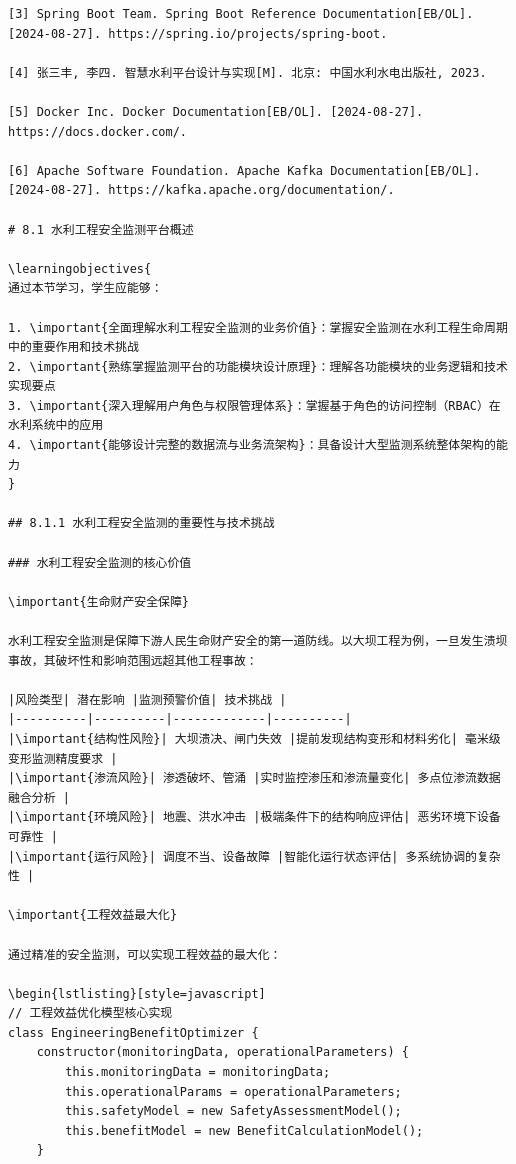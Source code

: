 \begin{verbatim}
[3] Spring Boot Team. Spring Boot Reference Documentation[EB/OL]. [2024-08-27]. https://spring.io/projects/spring-boot.

[4] 张三丰, 李四. 智慧水利平台设计与实现[M]. 北京: 中国水利水电出版社, 2023.

[5] Docker Inc. Docker Documentation[EB/OL]. [2024-08-27]. https://docs.docker.com/.

[6] Apache Software Foundation. Apache Kafka Documentation[EB/OL]. [2024-08-27]. https://kafka.apache.org/documentation/.

# 8.1 水利工程安全监测平台概述

\learningobjectives{
通过本节学习，学生应能够：

1. \important{全面理解水利工程安全监测的业务价值}：掌握安全监测在水利工程生命周期中的重要作用和技术挑战
2. \important{熟练掌握监测平台的功能模块设计原理}：理解各功能模块的业务逻辑和技术实现要点
3. \important{深入理解用户角色与权限管理体系}：掌握基于角色的访问控制（RBAC）在水利系统中的应用
4. \important{能够设计完整的数据流与业务流架构}：具备设计大型监测系统整体架构的能力
}

## 8.1.1 水利工程安全监测的重要性与技术挑战

### 水利工程安全监测的核心价值

\important{生命财产安全保障}

水利工程安全监测是保障下游人民生命财产安全的第一道防线。以大坝工程为例，一旦发生溃坝事故，其破坏性和影响范围远超其他工程事故：

|风险类型| 潜在影响 |监测预警价值| 技术挑战 |
|----------|----------|-------------|----------|
|\important{结构性风险}| 大坝溃决、闸门失效 |提前发现结构变形和材料劣化| 毫米级变形监测精度要求 |
|\important{渗流风险}| 渗透破坏、管涌 |实时监控渗压和渗流量变化| 多点位渗流数据融合分析 |
|\important{环境风险}| 地震、洪水冲击 |极端条件下的结构响应评估| 恶劣环境下设备可靠性 |
|\important{运行风险}| 调度不当、设备故障 |智能化运行状态评估| 多系统协调的复杂性 |

\important{工程效益最大化}

通过精准的安全监测，可以实现工程效益的最大化：

\begin{lstlisting}[style=javascript]
// 工程效益优化模型核心实现
class EngineeringBenefitOptimizer {
    constructor(monitoringData, operationalParameters) {
        this.monitoringData = monitoringData;
        this.operationalParams = operationalParameters;
        this.safetyModel = new SafetyAssessmentModel();
        this.benefitModel = new BenefitCalculationModel();
    }
    

\end{verbatim}
